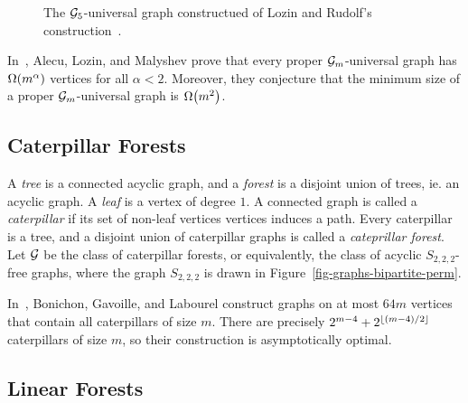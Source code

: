 \begin{figure}[ht]
\captionsetup{justification=centering}
\caption{The $\mathcal{G}_5$-universal graph constructued of Lozin and Rudolf's construction~\cite{lozin:minimal-univers:}.}
\label{fig-graphs-bipartite-perm-univ}
\end{figure}

In~\cite{alecu:critical-properties:}, Alecu, Lozin, and Malyshev prove that every proper $\mathcal{G}_m$-universal graph has $\Omega{\left(m^\alpha\right)}$ vertices for all $\alpha < 2$. Moreover, they conjecture that the minimum size of a proper $\mathcal{G}_m$-universal graph is $\Omega{\left(m^2\right)}$.

\subsection{Caterpillar Forests}

A \emph{tree} is a connected acyclic graph, and a \emph{forest} is a disjoint union of trees, ie. an acyclic graph. A \emph{leaf} is a vertex of degree $1$. A connected graph is called a \emph{caterpillar} if its set of non-leaf vertices vertices induces a path. Every caterpillar is a tree, and a disjoint union of caterpillar graphs is called a \emph{cateprillar forest}. Let $\mathcal{G}$ be the class of caterpillar forests, or equivalently, the class of acyclic $S_{2,2,2}$-free graphs, where the graph $S_{2,2,2}$ is drawn in Figure~\ref{fig-graphs-bipartite-perm}.

In~\cite{bonichon:short-labels:}, Bonichon, Gavoille, and Labourel construct graphs on at most $64m$ vertices that contain all caterpillars of size $m$. There are precisely $2^{m-4} + 2^{{\left\lfloor{(m-4)/2}\right\rfloor}}$ caterpillars of size $m$, so their construction is asymptotically optimal.

\subsection{Linear Forests}

